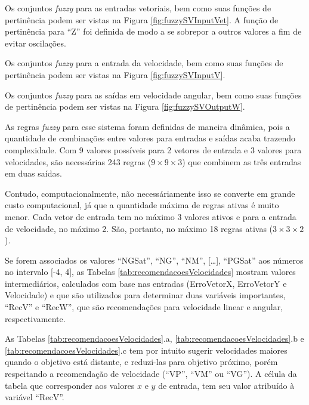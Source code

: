 	
	
	Os conjuntos \textit{fuzzy} para as entradas vetoriais, bem como suas funções de pertinência podem 
	ser vistas na Figura \ref{fig:fuzzySVInputVet}. A função de pertinência para ``Z'' foi
	definida de modo a se sobrepor a outros valores a fim de evitar oscilações.
	
	
	
	Os conjuntos \textit{fuzzy} para a entrada da velocidade, bem como suas funções de pertinência podem 
	ser vistas na Figura \ref{fig:fuzzySVInputV}. 
	
	
	
	Os conjuntos \textit{fuzzy} para as saídas em velocidade angular, bem como suas funções de 
	pertinência podem ser vistas na Figura \ref{fig:fuzzySVOutputW}.
	
	
	
	As regras \textit{fuzzy} para esse sistema foram definidas de maneira dinâmica, pois a 
	quantidade de combinações entre valores para entradas e saídas acaba trazendo complexidade.
	Com 9 valores possíveis para 2 vetores de entrada e 3 valores para velocidades, são
	necessárias 243 regras ($9\times9\times3$) que combinem as três entradas em duas saídas.
	
	Contudo, computacionalmente, não necessáriamente isso se converte em grande custo 
	computacional, já que a quantidade máxima de regras ativas é muito menor. Cada vetor de
	entrada tem no máximo 3 valores ativos e para a entrada de velocidade, no máximo 2. São,
	portanto, no máximo 18 regras ativas ($3\times3\times2$).
	
	Se forem associados os valores ``NGSat'', ``NG'', ``NM'', [\dots], ``PGSat'' aos números 
	no intervalo [-4, 4], as Tabelas \ref{tab:recomendacoesVelocidades} mostram valores
	intermediários, calculados com base nas entradas (ErroVetorX, ErroVetorY e Velocidade) e 
	que são utilizados para determinar duas variáveis importantes, ``RecV'' e ``RecW'', que 
	são recomendações para velocidade linear e angular, respectivamente. 
	
	
	
	As Tabelas \ref{tab:recomendacoesVelocidades}.a, \ref{tab:recomendacoesVelocidades}.b e 
	\ref{tab:recomendacoesVelocidades}.c tem por intuito sugerir velocidades maiores quando 
	o objetivo está distante, e reduzi-las para objetivo próximo, porém respeitando a 
	recomendação de velocidade (``VP'', ``VM'' ou ``VG''). A célula da tabela que corresponder
	aos valores $x$ e $y$ de entrada, tem seu valor atribuído à variável ``RecV''. 
	
